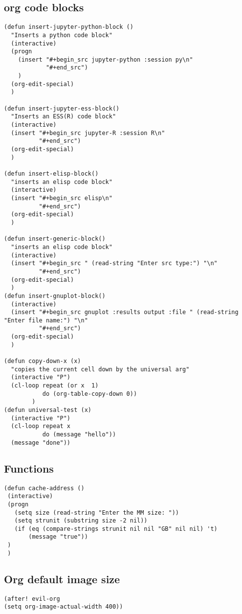 \documentclass{assignments}
\begin{document}
\subsection*{org code blocks}
\label{sec:org51c48b1}
\begin{verbatim}
(defun insert-jupyter-python-block ()
  "Inserts a python code block"
  (interactive)
  (progn
    (insert "#+begin_src jupyter-python :session py\n"
            "#+end_src")
    )
  (org-edit-special)
  )

(defun insert-jupyter-ess-block()
  "Inserts an ESS(R) code block"
  (interactive)
  (insert "#+begin_src jupyter-R :session R\n"
          "#+end_src")
  (org-edit-special)
  )

(defun insert-elisp-block()
  "inserts an elisp code block"
  (interactive)
  (insert "#+begin_src elisp\n"
          "#+end_src")
  (org-edit-special)
  )

(defun insert-generic-block()
  "inserts an elisp code block"
  (interactive)
  (insert "#+begin_src " (read-string "Enter src type:") "\n"
          "#+end_src")
  (org-edit-special)
  )
(defun insert-gnuplot-block()
  (interactive)
  (insert "#+begin_src gnuplot :results output :file " (read-string "Enter file name:") "\n"
          "#+end_src")
  (org-edit-special)
  )

(defun copy-down-x (x)
  "copies the current cell down by the universal arg"
  (interactive "P")
  (cl-loop repeat (or x  1)
           do (org-table-copy-down 0))
        )
(defun universal-test (x)
  (interactive "P")
  (cl-loop repeat x
           do (message "hello"))
  (message "done"))
\end{verbatim}

\subsection*{Functions}
\label{sec:org042f503}
\begin{verbatim}
(defun cache-address ()
 (interactive)
 (progn
   (setq size (read-string "Enter the MM size: "))
   (setq strunit (substring size -2 nil))
   (if (eq (compare-strings strunit nil nil "GB" nil nil) 't)
       (message "true"))
 )
 )
\end{verbatim}

\subsection*{Org default image size}
\label{sec:orge98f05f}
\begin{verbatim}
(after! evil-org
(setq org-image-actual-width 400))
\end{verbatim}
\end{document}

